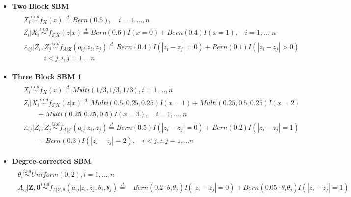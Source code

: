 \documentclass[12pt]{article}
\theoremstyle{definition}
\begin{document}
\begin{itemize}	
	\item \textbf{Two Block SBM}	
	\begin{equation}
	\begin{gathered}
	\begin{aligned}
	&	X_{i}  \overset{i.i.d}{\sim} f_{X}(x)  \stackrel{d}{=}  Bern(0.5), \quad   i = 1, \ldots , n \\ 
	&	Z_{i} | X_{i}   \overset{i.i.d}{\sim}    f_{Z|X}(z|x)  \stackrel{d}{=}  Bern(0.6) I( x = 0 ) +   Bern(0.4) I (x = 1), \quad  i = 1,\ldots,n  \\
	&	A_{ij} | Z_{i}, Z_{j}   \overset{i.i.d}{\sim}   f_{A|Z}(a_{ij} | z_{i}, z_{j}) \stackrel{d}{=}  Bern(0.4) I ( |z_{i} - z_{j}| = 0 )  + Bern(0.1) I(|z_{i} - z_{j}| > 0) \\ & \quad \quad \quad i < j, i,j=1, \ldots n 
	\end{aligned}
	\end{gathered}
	\label{eq:twoSBM}
	\end{equation} 
	
	\item \textbf{Three Block SBM 1}
	\begin{equation}
	\label{eq:Three}
	\begin{gathered}
	\begin{aligned}
	&  X_{i} \overset{i.i.d}{\sim} f_{X}(x)   \stackrel{d}{=}  Multi(1/3, 1/3, 1/3), i = 1, \ldots , n \\ 
	&  Z_{i} | X_{i}  \overset{i.i.d}{\sim}    f_{Z|X}(z|x)  \stackrel{d}{=}   Multi(0.5, 0.25, 0.25) I( x = 1 ) +   Multi(0.25, 0.5, 0.25) I (x = 2)  \qquad  \\ & \quad \quad + Multi(0.25, 0.25, 0.5)I(x = 3), \quad  i = 1,\ldots,n  \\
	&  A_{ij} | Z_{i}, Z_{j}   \overset{i.i.d}{\sim}   f_{A|Z}(a_{ij} | z_{i}, z_{j}) \stackrel{d}{=}  Bern(0.5) I ( |z_{i} - z_{j}| = 0 )  + Bern(0.2) I(|z_{i} - z_{j}| = 1) \\ & \quad \quad + Bern(0.3) I (|z_{i} - z_{j}| = 2),  \quad i < j, i,j=1, \ldots n 
	\end{aligned}
	\end{gathered}
	\end{equation}
	
	\item \textbf{Degree-corrected SBM}
	\begin{equation}
	\label{eq:dcSBM}
	\begin{gathered}
	\begin{split}
	\theta_{i} \overset{i.i.d}{\sim} Uniform(0,2), i = 1, \ldots, n \\ 
	A_{ij} | \mathbf{Z}, \mathbf{\theta}   \overset{i.i.d}{\sim}   f_{A|Z, \theta}(a_{ij} | z_{i}, z_{j}, \theta_{i}, \theta_{j}) \stackrel{d}{=} & Bern(0.2 \cdot \theta_{i}\theta_{j}) I ( |z_{i} - z_{j}| = 0 )  + Bern(0.05 \cdot \theta_{i} \theta_{j} ) I(|z_{i} - z_{j}| = 1) 
	\end{split}
	\end{gathered}
	\end{equation}
	

\end{itemize}
\end{document}
